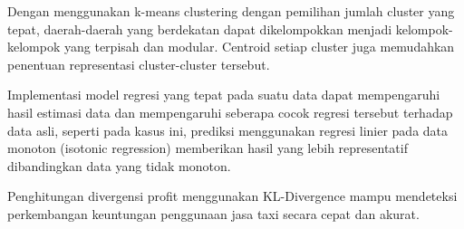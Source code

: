 \documentclass{article}
\begin{document}
Dengan menggunakan k-means clustering dengan pemilihan jumlah cluster yang tepat, daerah-daerah yang berdekatan dapat dikelompokkan menjadi kelompok-kelompok yang terpisah dan modular. Centroid setiap cluster juga memudahkan penentuan representasi cluster-cluster tersebut.

Implementasi model regresi yang tepat pada suatu data dapat mempengaruhi hasil estimasi data dan mempengaruhi seberapa cocok regresi tersebut terhadap data asli, seperti pada kasus ini, prediksi menggunakan regresi linier pada data monoton (isotonic regression) memberikan hasil yang lebih representatif dibandingkan data yang tidak monoton.

Penghitungan divergensi profit menggunakan KL-Divergence mampu mendeteksi perkembangan keuntungan penggunaan jasa taxi secara cepat dan akurat.
\end{document}

